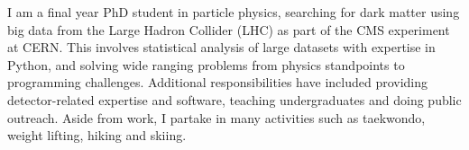 
\begin{cvparagraph}
I am a final year PhD student in particle physics, searching for dark matter using big data from the Large Hadron Collider (LHC) as part of the CMS experiment at CERN. This involves statistical analysis of large datasets with expertise in Python, and solving wide ranging problems from physics standpoints to programming challenges. Additional responsibilities have included providing detector-related expertise and software, teaching undergraduates and doing public outreach. Aside from work, I partake in many activities such as taekwondo, weight lifting, hiking and skiing.
\end{cvparagraph}
